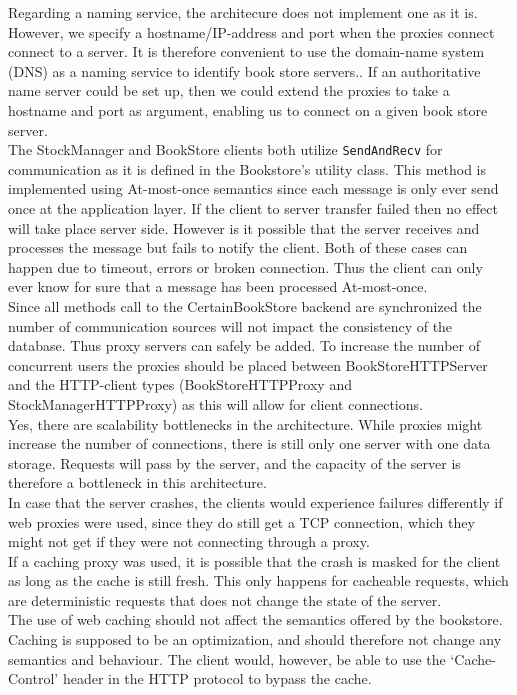 \documentclass[11pt]{article}
\begin{document}
Regarding a naming service, the architecure does not implement one as it is.
However, we specify a hostname/IP-address and port when the proxies connect
connect to a server. It is therefore convenient to use the domain-name system
(DNS) as a naming service to identify book store servers.. If an authoritative
name server could be set up, then we could extend the proxies to take a
hostname and port as argument, enabling us to connect on a given book store
server.\\


The StockManager and BookStore clients both utilize \texttt{SendAndRecv} for communication as it is defined in the Bookstore’s utility class. This method is implemented using At-most-once semantics since each message is only ever send once at the application layer. If the client to server transfer failed then no effect will take place server side. However is it possible that the server receives and processes the message but fails to notify the client. Both of these cases can happen due to timeout, errors or broken connection. Thus the client can only ever know for sure that a message has been processed At-most-once.\\


Since all methods call to the CertainBookStore backend are synchronized the number of communication sources will not impact the consistency of the database. Thus proxy servers can safely be added. To increase the number of concurrent users the proxies should be placed between BookStoreHTTPServer and the HTTP-client types (BookStoreHTTPProxy and StockManagerHTTPProxy) as this will allow for client connections.\\


Yes, there are scalability bottlenecks in the architecture. While proxies might increase the number of connections, there is still only one server with one data storage. Requests will pass by the server, and the capacity of the server is therefore a bottleneck in this architecture.\\


In case that the server crashes, the clients would experience failures differently if web proxies were used, since they do still get a TCP connection, which they might not get if they were not connecting through a proxy.\\

If a caching proxy was used, it is possible that the crash is masked for the client as long as the cache is still fresh. This only happens for cacheable requests, which are deterministic requests that does not change the state of the server.\\

The use of web caching should not affect the semantics offered by the bookstore. Caching is supposed to be an optimization, and should therefore not change any semantics and behaviour. The client would, however, be able to use the ‘Cache-Control’ header in the HTTP protocol to bypass the cache.\\
\end{document}
